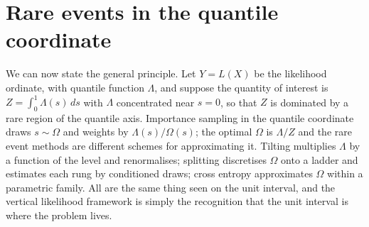 \section{Rare events in the quantile coordinate}

We can now state the general principle. Let $Y = L(X)$ be the likelihood ordinate, with quantile function $\Lambda$, and suppose the quantity of interest is $Z = \int_0^1 \Lambda(s) \, ds$ with $\Lambda$ concentrated near $s = 0$, so that $Z$ is dominated by a rare region of the quantile axis. Importance sampling in the quantile coordinate draws $s \sim \Omega$ and weights by $\Lambda(s) / \Omega(s)$; the optimal $\Omega$ is $\Lambda / Z$ and the rare event methods are different schemes for approximating it. Tilting multiplies $\Lambda$ by a function of the level and renormalises; splitting discretises $\Omega$ onto a ladder and estimates each rung by conditioned draws; cross entropy approximates $\Omega$ within a parametric family. All are the same thing seen on the unit interval, and the vertical likelihood framework is simply the recognition that the unit interval is where the problem lives.
